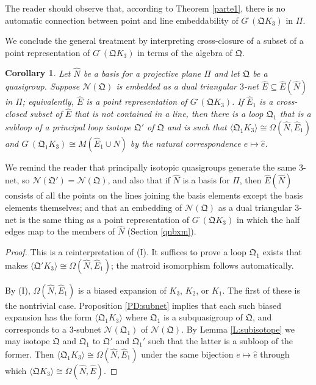 \documentclass[reqno,12pt]{amsart}
\newtheorem{cor}[thm]{Corollary}
\theoremstyle{remark}
\numberwithin{equation}{section}
\numberwithin{figure}{section}
\newcommand \bgr[1]{\langle#1\rangle}
\newcommand \full{^{{}^{{}_{{}_\bullet}}\!}}
\newcommand \cN{\mathcal{N}}
\newcommand \fQ{\mathfrak Q}
\newcommand \he{{\hat e}}
\newcommand \hE{{\hat E}}
\newcommand \hN{{\hat N}}
\newcommand\PP{\Pi}	%
\newcommand\G{{G\full}}
\begin{document}
The reader should observe that, according to Theorem \ref{parte1}, there is no automatic connection between point and line embeddability of $\G(\fQ K_3)$ in $\PP$.

We conclude the general treatment by interpreting cross-closure of a subset of a point representation of $\G(\fQ K_3)$ in terms of the algebra of $\fQ$.  

\begin{cor} \label{CD:triplane}
Let $\hN$ be a basis for a projective plane $\PP$ and let $\fQ$ be a quasigroup.  
Suppose $\cN(\fQ)$ is embedded as a dual triangular $3$-net $\hE \subseteq \hE(\hN)$ in $\PP$; equivalently, $\hE$ is a point representation of  $\G(\fQ K_3)$.  
If $\hE_1$ is a cross-closed subset of $\hE$ that is not contained in a line, then there is a loop $\fQ_1$ that is a subloop of a principal loop isotope $\fQ'$ of $\fQ$ and is such that $\bgr{\fQ_1 K_3} \cong \Omega(\hN,\hE_1)$ and $\G(\fQ_1 K_3) \cong M(\hE_1 \cup \hN)$ by the natural correspondence $e \mapsto \he$.  
\end{cor}

We remind the reader that principally isotopic quasigroups generate the same $3$-net, so $\cN(\fQ') = \cN(\fQ)$, and also that if $\hN$ is a basis for $\PP$, then $\hE(\hN)$ consists of all the points on the lines joining the basis elements except the basis elements themselves; and that an embedding of $\cN(\fQ)$ as a dual triangular $3$-net is the same thing as a point representation of $\G(\fQ K_3)$ in which the half edges map to the members of $\hN$ (Section \ref{qnbxm}).

\begin{proof}
This is a reinterpretation of \cite[Corollary 2.4]{BG6}(I). %
It suffices to prove a loop $\fQ_1$ exists that makes $\bgr{\fQ' K_3} \cong \Omega(\hN,\hE_1)$; the matroid isomorphism follows automatically.

By \cite[Corollary 2.4]{BG6}(I), %
$\Omega(\hN,\hE_1)$ is a biased expansion of $K_3$, $K_2$, or $K_1$.  The first of these is the nontrivial case.  Proposition \ref{PD:subnet} implies that each such biased expansion has the form $\bgr{\fQ_1 K_3}$ where $\fQ_1$ is a subquasigroup of $\fQ$, and corresponds to a $3$-subnet $\cN(\fQ_1)$ of $\cN(\fQ)$.  By Lemma \ref{L:subisotope} we may isotope $\fQ$ and $\fQ_1$ to $\fQ'$ and $\fQ_1'$ such that the latter is a subloop of the former.  Then $\bgr{\fQ_1 K_3} \cong \Omega(\hN,\hE_1)$ under the same bijection $e \mapsto \he$ through which $\bgr{\fQ K_3} \cong \Omega(\hN,\hE)$.
\end{proof}
\end{document}
